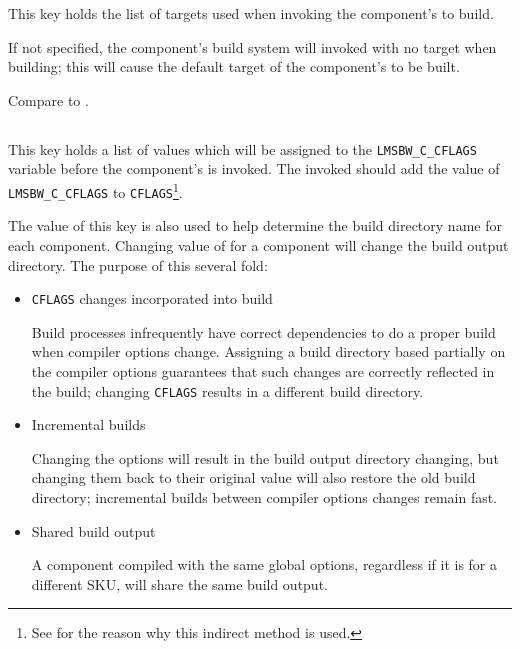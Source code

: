 This key holds the list of targets used when invoking the component's
\makefile to build.

If not specified, the component's build system will invoked with no
target when building; this will cause the default target of the
component's \makefile to be built.

Compare to .


\subsection{}\label{variables:cflags}

This key holds a list of values which will be assigned to the
\texttt{LMSBW\_C\_CFLAGS} variable before the component's \makefile is
invoked.  The invoked \makefile should add the value of
\texttt{LMSBW\_C\_CFLAGS} to \texttt{CFLAGS}\footnote{See
   for the reason why this indirect method is used.}.

The value of this key is also used to help determine the build
directory name for each component.  Changing value of
 for a component will change the build
output directory. The purpose of this several fold:

\begin{itemize}
\item \texttt{CFLAGS} changes incorporated into build

  Build processes infrequently have correct dependencies to do a
  proper build when compiler options change.  Assigning a build
  directory based partially on the compiler options guarantees that
  such changes are correctly reflected in the build; changing
  \texttt{CFLAGS} results in a different build directory.

\item Incremental builds

  Changing the options will result in the build output directory
  changing, but changing them back to their original value will also
  restore the old build directory; incremental builds between compiler
  options changes remain fast.

\item Shared build output

  A component compiled with the same global options, regardless if it
  is for a different SKU, will share the same build output.
\end{itemize}

